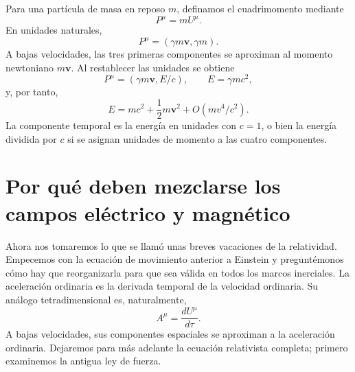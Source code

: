 \begin{classroomqa}\end{classroomqa}

Para una partícula de masa en reposo \(m\), definamos el cuadrimomento mediante \begin{equation}
  P^\mu=mU^\mu.
\end{equation} En unidades naturales, \begin{equation}
  P^\mu=(\gamma m\boldsymbol v,\gamma m).
\end{equation} A bajas velocidades, las tres primeras componentes se aproximan al momento newtoniano \(m\boldsymbol v\). Al restablecer las unidades se obtiene \begin{equation}
  P^\mu=(\gamma m\boldsymbol v,E/c),
  \qquad E=\gamma mc^2,
\end{equation} y, por tanto, \begin{equation}
  E=mc^2+\frac{1}{2}m\boldsymbol v^2+O(mv^4/c^2).
\end{equation} La componente temporal es la energía en unidades con \(c=1\), o bien la energía dividida por \(c\) si se asignan unidades de momento a las cuatro componentes.

\begin{classroomqa}\end{classroomqa}

\section{Por qué deben mezclarse los campos eléctrico y magnético}

Ahora nos tomaremos lo que se llamó unas breves vacaciones de la relatividad. Empecemos con la ecuación de movimiento anterior a Einstein y preguntémonos cómo hay que reorganizarla para que sea válida en todos los marcos inerciales. La aceleración ordinaria es la derivada temporal de la velocidad ordinaria. Su análogo tetradimensional es, naturalmente, \begin{equation}
  A^\mu=\frac{dU^\mu}{d\tau}.
\end{equation} A bajas velocidades, sus componentes espaciales se aproximan a la aceleración ordinaria. Dejaremos para más adelante la ecuación relativista completa; primero examinemos la antigua ley de fuerza.

